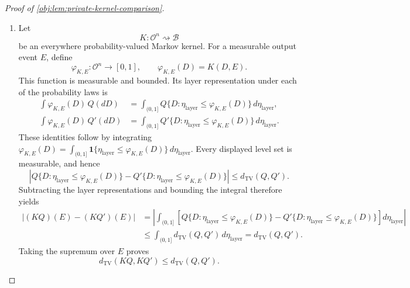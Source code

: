 \documentclass[11pt]{article}
\begin{document}
\begin{proof}[Proof of \cref{obj:lem:private-kernel-comparison}]
\begin{enumerate}
\item Let
\[
K:\mathcal O^n\rightsquigarrow\mathcal B
\]
be an everywhere probability-valued Markov kernel. For a measurable output event \(E\), define
\[
\varphi_{K,E}:\mathcal O^n\longrightarrow[0,1],
\qquad
\varphi_{K,E}(D)=K(D,E).
\]
This function is measurable and bounded. Its layer representation under each of the probability laws is
\[
\begin{aligned}
\int\varphi_{K,E}(D)\,Q(dD)
&=\int_{(0,1]}Q\{D:\eta_{\mathrm{layer}}\le\varphi_{K,E}(D)\}\,d\eta_{\mathrm{layer}},\\
\int\varphi_{K,E}(D)\,Q'(dD)
&=\int_{(0,1]}Q'\{D:\eta_{\mathrm{layer}}\le\varphi_{K,E}(D)\}\,d\eta_{\mathrm{layer}}.
\end{aligned}
\]
These identities follow by integrating
\(\varphi_{K,E}(D)=\int_{(0,1]}\mathbf 1\{\eta_{\mathrm{layer}}\le\varphi_{K,E}(D)\}\,d\eta_{\mathrm{layer}}\).
Every displayed level set is measurable, and hence
\[
\left|
Q\{D:\eta_{\mathrm{layer}}\le\varphi_{K,E}(D)\}
-
Q'\{D:\eta_{\mathrm{layer}}\le\varphi_{K,E}(D)\}
\right|
\le d_{\mathrm{TV}}(Q,Q').
\]
Subtracting the layer representations and bounding the integral therefore yields
\[
\begin{aligned}
|(KQ)(E)-(KQ')(E)|
&=
\left|
\int_{(0,1]}
\left[
Q\{D:\eta_{\mathrm{layer}}\le\varphi_{K,E}(D)\}
-
Q'\{D:\eta_{\mathrm{layer}}\le\varphi_{K,E}(D)\}
\right]d\eta_{\mathrm{layer}}
\right|\\
&\le \int_{(0,1]}d_{\mathrm{TV}}(Q,Q')\,d\eta_{\mathrm{layer}}
=d_{\mathrm{TV}}(Q,Q').
\end{aligned}
\]
Taking the supremum over \(E\) proves
\[
d_{\mathrm{TV}}(KQ,KQ')\le d_{\mathrm{TV}}(Q,Q').
\]


\end{enumerate}
\end{proof}
\end{document}

